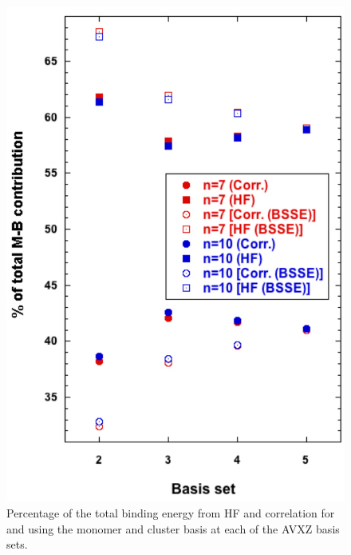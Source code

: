 \begin{figure}[t]
\uwsinglespace
\centering
\includegraphics[width=.5\textwidth]{Figures/Chapter_2/percent_corr_HF_7_10.pdf}
\begin{spacing}{1.0}
\caption[Percentage of the total binding energy from HF and correlation for  and  using the monomer and cluster basis at each of the AVXZ basis sets.]{Percentage of the total binding energy from HF and correlation for  and  using the monomer and cluster basis at each of the AVXZ basis sets.}\label{fig:MBE_I_F8}
\end{spacing}
\end{figure}
